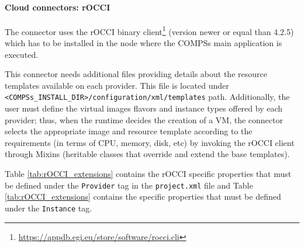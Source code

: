 \paragraph{Cloud connectors: rOCCI}
The connector uses the rOCCI binary client\footnote{\url{https://appdb.egi.eu/store/software/rocci.cli}} 
(version newer or equal than 4.2.5) which has to be installed in the node where the COMPSs main 
application is executed.

This connector needs additional files providing details about the resource templates available on 
each provider. This file is located under \\ \texttt{<COMPSs\_INSTALL\_DIR>/configuration/xml/templates} path. Additionally, the user must define the virtual images flavors and instance types offered by each provider; 
thus, when the runtime decides the creation of a VM, the connector selects the appropriate image and 
resource template according to the requirements (in terms of CPU, memory, disk, etc) by invoking the 
rOCCI client through Mixins (heritable classes that override and extend the base templates).

Table \ref{tab:rOCCI_extensions} contains the rOCCI specific properties that must be defined under the \texttt{Provider} tag in
the \texttt{project.xml} file and Table \ref{tab:rOCCI_extensions} contains the specific properties that must be defined
under the \texttt{Instance} tag.

